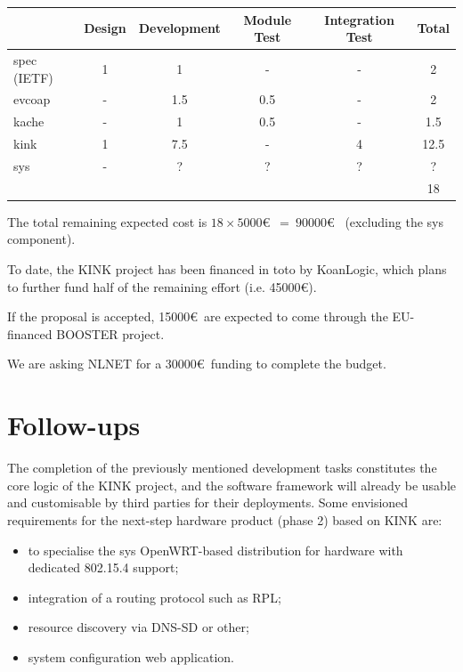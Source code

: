 \documentclass[12pt]{article}
\begin{document}
\begin{center}
\begin{tabular}{|l|c|c|c|c|c|}
	\hline 
	  & Design & Development & Module Test & Integration Test & Total \\
	\hline
	spec (IETF) & 1     & 1     & -     & -     & 2 \\
	\hline 
	evcoap      & -     & 1.5   & 0.5   & -     & 2 \\
	\hline
	kache       & -     & 1     & 0.5   & -     & 1.5 \\
	\hline
	kink        & 1     & 7.5   & -     & 4     & 12.5 \\
	\hline
	sys         & -     & ?     & ?     & ?     & ? \footnotemark \\
	\hline
	\multicolumn{5}{|c|}{} & 18 \\
	\hline
\end{tabular}
\end{center}

The total remaining expected cost is $18 \times 5000$\euro~$=~90000$\euro~ (excluding the sys component).

To date, the KINK project has been financed in toto by KoanLogic, which plans to further fund half of the remaining effort (i.e. 45000\euro).

If the proposal is accepted, 15000\euro~are expected to come through the EU-financed BOOSTER project.

We are asking NLNET for a 30000\euro~funding to complete the budget.

\section{Follow-ups}

The completion of the previously mentioned development tasks constitutes the core logic of the KINK project, and the software framework will already be usable and customisable by third parties for their deployments. Some envisioned requirements for the next-step hardware product (phase 2) based on KINK are:

\begin{itemize}
\item to specialise the sys OpenWRT-based distribution for hardware with dedicated 802.15.4 support;
\item integration of a routing protocol such as RPL;
\item resource discovery via DNS-SD or other;
\item system configuration web application.
\end{itemize}
\end{document}
